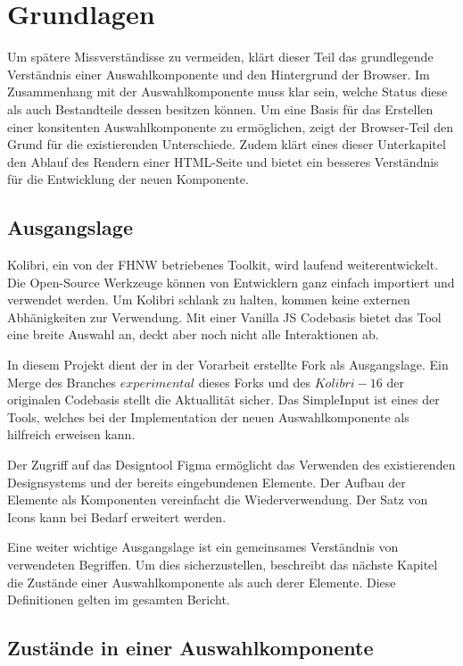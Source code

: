\chapter{Grundlagen}

Um spätere Missverständisse zu vermeiden, klärt dieser Teil das grundlegende Verständnis einer Auswahlkomponente und den Hintergrund der Browser.
Im Zusammenhang mit der Auswahlkomponente muss klar sein, welche Status diese als auch Bestandteile dessen besitzen können.
Um eine Basis für das Erstellen einer konsitenten Auswahlkomponente zu ermöglichen, zeigt der Browser-Teil den Grund für die existierenden Unterschiede.
Zudem klärt eines dieser Unterkapitel den Ablauf des Rendern einer HTML-Seite und bietet ein besseres Verständnis für die Entwicklung der neuen Komponente.


\section{Ausgangslage}

Kolibri, ein von der FHNW betriebenes Toolkit, wird laufend weiterentwickelt.
Die Open-Source Werkzeuge können von Entwicklern ganz einfach importiert und verwendet werden.
Um Kolibri schlank zu halten, kommen keine externen Abhänigkeiten zur Verwendung.
Mit einer Vanilla JS Codebasis bietet das Tool eine breite Auswahl an, deckt aber noch nicht alle Interaktionen ab.

In diesem Projekt dient der in der Vorarbeit erstellte Fork als Ausgangslage.
Ein Merge des Branches $experimental$ dieses Forks und des $Kolibri-16$ der originalen Codebasis stellt die Aktuallität sicher.
Das SimpleInput ist eines der Tools, welches bei der Implementation der neuen Auswahlkomponente als hilfreich erweisen kann.

Der Zugriff auf das Designtool Figma ermöglicht das Verwenden des existierenden Designsystems und der bereits eingebundenen Elemente. 
Der Aufbau der Elemente als Komponenten vereinfacht die Wiederverwendung. 
Der Satz von Icons kann bei Bedarf erweitert werden.

Eine weiter wichtige Ausgangslage ist ein gemeinsames Verständnis von verwendeten Begriffen. 
Um dies sicherzustellen, beschreibt das nächste Kapitel die Zustände einer Auswahlkomponente als auch derer Elemente.
Diese Definitionen gelten im gesamten Bericht.


\section{Zustände in einer Auswahlkomponente}

